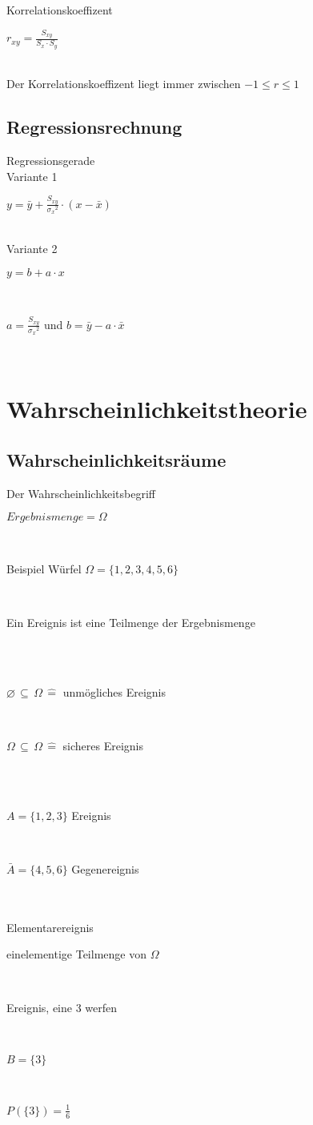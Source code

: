 \documentclass[10pt,a4paper,landscape]{article}
\begin{document}
\begin{multicols*}{4}
Korrelationskoeffizent \\
\parbox{\columnwidth}{\centering$r_{xy} = \frac{S_{xy}}{S_x \cdot S_y}$}\\
Der Korrelationskoeffizent liegt immer zwischen $-1 \leq r \leq 1$\\

\subsection{Regressionsrechnung}
Regressionsgerade\\
Variante 1\\
\parbox{\columnwidth}{\centering$y = \bar{y} + \frac{S_{xy}}{{\sigma_x}^2} \cdot (x-\bar{x})$}\\
Variante 2\\
\parbox{\columnwidth}{\centering$y = b + a \cdot x$}\\
\parbox{\columnwidth}{\centering$a = \frac{S_{xy}}{{\sigma_x}^2}$ und $b = \bar{y} - a \cdot \bar{x}$}\\

\section{Wahrscheinlichkeitstheorie}
\subsection{Wahrscheinlichkeitsräume}
Der Wahrscheinlichkeitsbegriff\\
\parbox{\columnwidth}{\centering$Ergebnismenge = \Omega$}\\
\parbox{\columnwidth}{\centering Beispiel Würfel $\Omega = \{ 1, 2, 3, 4, 5, 6 \}$}\\
\parbox{\columnwidth}{\centering Ein Ereignis ist eine Teilmenge der Ergebnismenge}\\\\
\parbox{\columnwidth}{\centering$\varnothing \, \subseteq \, \Omega \, \widehat{=}$ unmögliches Ereignis}\\
\parbox{\columnwidth}{\centering$\Omega \, \subseteq \, \Omega \, \widehat{=}$ sicheres Ereignis}\\\\
\parbox{\columnwidth}{\centering$A = \{1, 2, 3 \}$ Ereignis}\\
\parbox{\columnwidth}{\centering$\bar{A} = \{4, 5, 6 \}$ Gegenereignis}\\\\
Elementarereignis\\
\parbox{\columnwidth}{\centering einelementige Teilmenge von $\Omega$}\\
\parbox{\columnwidth}{\centering Ereignis, eine 3 werfen}\\
\parbox{\columnwidth}{\centering $B = \{ 3 \}$}\\
\parbox{\columnwidth}{\centering $P(\{3\}) = \frac{1}{6}$}\\


\end{multicols*}
\end{document}
